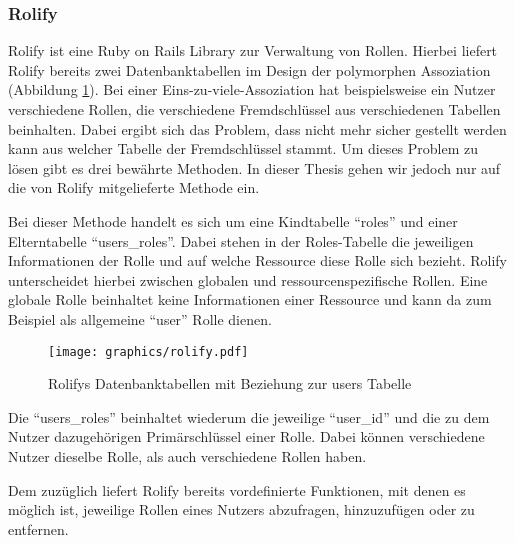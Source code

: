 \subsubsection{Rolify}
\label{sec: rolify}
Rolify ist eine Ruby on Rails Library zur Verwaltung von Rollen. Hierbei liefert Rolify bereits zwei Datenbanktabellen im Design der polymorphen Assoziation (Abbildung \ref{fig:server-polymorph-association}). Bei einer Eins-zu-viele-Assoziation hat beispielsweise ein Nutzer verschiedene Rollen, die verschiedene Fremdschlüssel aus verschiedenen Tabellen beinhalten. Dabei ergibt sich das Problem, dass nicht mehr sicher gestellt werden kann aus welcher Tabelle der Fremdschlüssel stammt. Um dieses Problem zu lösen gibt es drei bewährte Methoden. In dieser Thesis gehen wir jedoch nur auf die von Rolify mitgelieferte Methode ein.

Bei dieser Methode handelt es sich um eine Kindtabelle \enquote{roles} und einer Elterntabelle \enquote{users\_roles}. Dabei stehen in der Roles-Tabelle die jeweiligen Informationen der Rolle und auf welche Ressource diese Rolle sich bezieht. Rolify unterscheidet hierbei zwischen globalen und ressourcenspezifische Rollen. Eine globale Rolle beinhaltet keine Informationen einer Ressource und kann da zum Beispiel als allgemeine \enquote{user} Rolle dienen.

\begin{figure}[h]
	\centering
	\texttt{[image: graphics/rolify.pdf]}
	\caption{Rolifys Datenbanktabellen mit Beziehung zur users Tabelle}
	\label{fig:server-polymorph-association}
\end{figure}

Die \enquote{users\_roles} beinhaltet wiederum die jeweilige \enquote{user\_id} und die zu dem Nutzer dazugehörigen Primärschlüssel einer Rolle. Dabei können verschiedene Nutzer dieselbe Rolle, als auch verschiedene Rollen haben.

Dem zuzüglich liefert Rolify bereits vordefinierte Funktionen, mit denen es möglich ist, jeweilige Rollen eines Nutzers abzufragen, hinzuzufügen oder zu entfernen.



